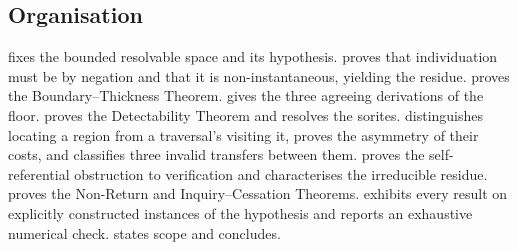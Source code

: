 \documentclass[11pt,a4paper]{article}
\theoremstyle{thmstyle}
\theoremstyle{definition}
\theoremstyle{remark}
\begin{document}
\subsection{Organisation}

 fixes the bounded resolvable space and its hypothesis.
 proves that individuation must be by negation and that it
is non-instantaneous, yielding the residue.  proves the
Boundary--Thickness Theorem.  gives the three agreeing
derivations of the floor.  proves the Detectability Theorem
and resolves the sorites.  distinguishes locating a region
from a traversal's visiting it, proves the asymmetry of their costs, and
classifies three invalid transfers between them.  proves the
self-referential obstruction to verification and characterises the irreducible
residue.  proves the Non-Return and Inquiry--Cessation
Theorems.  exhibits every result on explicitly constructed
instances of the hypothesis and reports an exhaustive numerical check.
 states scope and concludes.
\end{document}
